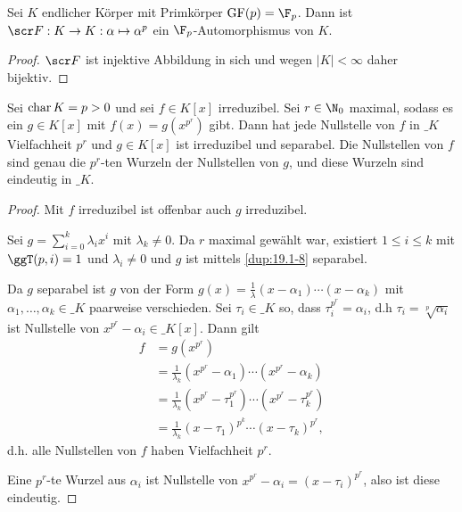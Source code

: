 \begin{kor} \label{19.1-17}
	Sei $K$ endlicher Körper mit Primkörper $\GF(p) = \F_p$.
	Dann ist $\scr F: K \to K: \alpha \mapsto \alpha^p$ ein $\F_p$-Automorphismus von $K$.
	\begin{proof}
		$\scr F$ ist injektive Abbildung in sich und wegen $|K| < \infty$ daher bijektiv.
	\end{proof}
\end{kor}

\begin{lem} \label{19.1-18}
	Sei $\operatorname{char} K = p > 0$ und sei $f \in K[x]$ irreduzibel.
	Sei $r \in \N_0$ maximal, sodass es ein $g \in K[x]$ mit $f(x) = g(x^{p^r})$ gibt.
	Dann hat jede Nullstelle von $f$ in $\_K$ Vielfachheit $p^r$ und $g \in K[x]$ ist irreduzibel und separabel.
	Die Nullstellen von $f$ sind genau die $p^r$-ten Wurzeln der Nullstellen von $g$, und diese Wurzeln sind eindeutig in $\_K$.
	\begin{proof}
		Mit $f$ irreduzibel ist offenbar auch $g$ irreduzibel.

		Sei $g = \sum_{i=0}^{k} \lambda_i x^i$ mit $\lambda_k \neq 0$.
		Da $r$ maximal gewählt war, existiert $1 \le i \le k$ mit $\ggT(p,i)=1$ und $\lambda_i \neq 0$ und $g$ ist mittels \ref{dup:19.1-8} separabel.

		Da $g$ separabel ist $g$ von der Form $g(x) = \frac{1}{\lambda} (x-\alpha_1)\dotsb (x-\alpha_k)$ mit $\alpha_1, \dotsc, \alpha_k \in \_K$ paarweise verschieden.
		Sei $\tau_i \in \_K$ so, dass $\tau_i^{p^r} = \alpha_i$, d.h $\tau_i = \sqrt[p]{\alpha_i}$ ist Nullstelle von $x^{p^r} - \alpha_i \in \_K[x]$.
		Dann gilt
		\begin{align*}
			f &= g(x^{p^r}) \\
			&= \frac{1}{\lambda_k} (x^{p^r} - \alpha_1) \dotsb (x^{p^r} - \alpha_k) \\
			&= \frac{1}{\lambda_k} (x^{p^r} - \tau_1^{p^r}) \dotsb (x^{p^r} - \tau_k^{p^r}) \\
			&= \frac{1}{\lambda_k}(x-\tau_1)^{p^k} \dotsb (x-\tau_k)^{p^r},
		\end{align*}
		d.h. alle Nullstellen von $f$ haben Vielfachheit $p^r$.

		Eine $p^r$-te Wurzel aus $\alpha_i$ ist Nullstelle von $x^{p^r} - \alpha_i = (x-\tau_i)^{p^r}$, also ist diese eindeutig.
	\end{proof}
\end{lem}

